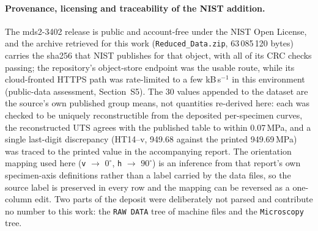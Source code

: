 \documentclass[11pt,a4paper,twocolumn]{article}
\providecommand{\ang}[1]{\ensuremath{#1^{\circ}}}
\begin{document}
\paragraph{Provenance, licensing and traceability of the NIST addition.} The mds2-3402 release is public and
account-free under the NIST Open License, and the archive retrieved for this work (\texttt{Reduced\_Data.zip},
63\,085\,120 bytes) carries the sha256 that NIST publishes for that object, with all of its CRC checks passing;
the repository's object-store endpoint was the usable route, while its cloud-fronted HTTPS path was rate-limited
to a few kB\,s$^{-1}$ in this environment (public-data assessment, Section~S5). The 30 values appended to the
dataset are the source's own published group means, not quantities re-derived here: each was checked to be uniquely
reconstructible from the deposited per-specimen curves, the reconstructed UTS agrees with the published table to
within 0.07\,MPa, and a single last-digit discrepancy (HT14--v, 949.68 against the printed 949.69\,MPa) was traced
to the printed value in the accompanying report. The orientation mapping used here (\texttt{v} $\rightarrow$
$\ang{0}$, \texttt{h} $\rightarrow$ $\ang{90}$) is an inference from that report's own specimen-axis definitions
rather than a label carried by the data files, so the source label is preserved in every row and the mapping can
be reversed as a one-column edit. Two parts of the deposit were deliberately not parsed and contribute no number to
this work: the \texttt{RAW DATA} tree of machine files and the \texttt{Microscopy} tree.
\end{document}
